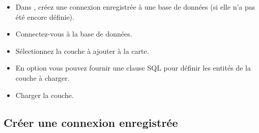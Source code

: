 \begin{itemize}[label=--]
\item Dans \qg, créez une connexion enregistrée à une base de données \psq (si elle n'a pas été encore définie).
\item Connectez-vous à la base de données.
\item Sélectionnez la couche à ajouter à la carte.
\item En option vous pouvez fournir une clause SQL  pour définir les entités de la couche à charger.
\item Charger la couche.
\end{itemize}

\subsection{Créer une connexion enregistrée}  \label{sec:postgis_stored}


